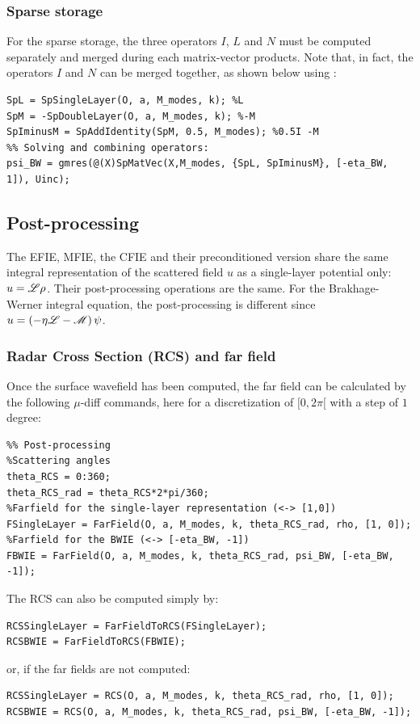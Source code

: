 \subsubsection{Sparse storage}

For the sparse storage, the three operators $I$, $L$ and $N$ must be computed separately and merged during each matrix-vector products. Note that, in fact, the operators $I$ and $N$ can be merged together, as shown below using \SpAddIdentity:
\begin{lstlisting}
SpL = SpSingleLayer(O, a, M_modes, k); %L
SpM = -SpDoubleLayer(O, a, M_modes, k); %-M
SpIminusM = SpAddIdentity(SpM, 0.5, M_modes); %0.5I -M
%% Solving and combining operators:
psi_BW = gmres(@(X)SpMatVec(X,M_modes, {SpL, SpIminusM}, [-eta_BW, 1]), Uinc);
\end{lstlisting}
\medskip

\subsection{Post-processing}

The EFIE, MFIE, the CFIE and their preconditioned version share the same integral representation of the scattered field $u$ as a single-layer potential only: $u = {\mathscr L}\rho$. Their post-processing operations are the same. For the Brakhage-Werner integral equation, the post-processing is different since $u = \left(-\eta{\mathscr L} - {\mathscr M}\right)\psi$.

\subsubsection{Radar Cross Section (RCS) and far field}

Once the surface wavefield has been computed, the far field can be calculated by the following $\mu$-diff  commands, here for a discretization of $[0,2\pi[$ with a step of $1$ degree:
\begin{lstlisting}
%% Post-processing
%Scattering angles 
theta_RCS = 0:360;
theta_RCS_rad = theta_RCS*2*pi/360;
%Farfield for the single-layer representation (<-> [1,0])
FSingleLayer = FarField(O, a, M_modes, k, theta_RCS_rad, rho, [1, 0]);
%Farfield for the BWIE (<-> [-eta_BW, -1])
FBWIE = FarField(O, a, M_modes, k, theta_RCS_rad, psi_BW, [-eta_BW, -1]);

\end{lstlisting}

The RCS can also be computed simply by:
\begin{lstlisting}
RCSSingleLayer = FarFieldToRCS(FSingleLayer);
RCSBWIE = FarFieldToRCS(FBWIE);
\end{lstlisting}
or, if the far fields are not computed:
\begin{lstlisting}
RCSSingleLayer = RCS(O, a, M_modes, k, theta_RCS_rad, rho, [1, 0]);
RCSBWIE = RCS(O, a, M_modes, k, theta_RCS_rad, psi_BW, [-eta_BW, -1]);
\end{lstlisting}

